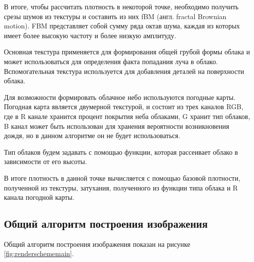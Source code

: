 В итоге, чтобы рассчитать плотность в некоторой точке, необходимо получить срезы шумов из текстуры и составить из них fBM (англ. fractal Brownian motion). FBM представляет собой сумму ряда октав шума, каждая из которых имеет более высокую частоту и более низкую амплитуду.

Основная текстура применяется для формирования общей грубой формы облака и может использоваться для определения факта попадания луча в облако. Вспомогательная текстура используется для добавления деталей на поверхности облака.

Для возможности формировать облачное небо используются погодные карты. Погодная карта является двумерной текстурой, и состоит из трех каналов RGB, где в R канале хранится процент покрытия неба облаками, G хранит тип облаков, B канал может быть использован для хранения вероятности возникновения дождя, но в данном алгоритме он не будет использоваться. 

Тип облаков будем задавать с помощью функции, которая рассеивает облако в зависимости от его высоты. 

В итоге плотность в данной точке вычисляется с помощью базовой плотности, полученной из текстуры, затухания, полученного из функции типа облака и R канала погодной карты. 

\subsection{Общий алгоритм построения изображения}

Общий алгоритм построения изображения показан на рисунке \ref{fig:renderschememain}.

